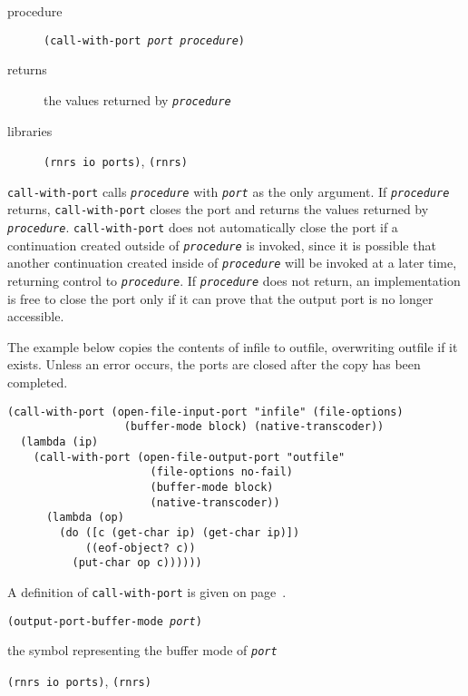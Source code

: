 \begin{description}

\label{io_s51}\label{io_desc_call_with_port}
\item[procedure] \texttt{(call-with-port \textit{port} \textit{procedure})}



\item[returns] the values returned by \texttt{\textit{procedure}}


\item[libraries] \texttt{(rnrs io ports)}, \texttt{(rnrs)}
\end{description}

\texttt{call-with-port} calls \texttt{\textit{procedure}} with \texttt{\textit{port}} as the only
argument.
If \texttt{\textit{procedure}} returns, \texttt{call-with-port} closes the port and
returns the values returned by \texttt{\textit{procedure}}.
\texttt{call-with-port} does not automatically close the
port if a continuation created outside of \texttt{\textit{procedure}} is invoked, since it
is possible that another continuation created inside of \texttt{\textit{procedure}} will be
invoked at a later time, returning control to \texttt{\textit{procedure}}.
If \texttt{\textit{procedure}} does not return, an implementation is free to close the
port only if it can prove that the output port is no longer accessible.

The example below copies the contents of infile to outfile, overwriting
outfile if it exists.
Unless an error occurs, the ports are closed after the copy has been
completed.


\begin{alltt}
(call-with-port (open-file-input-port "infile" (file-options)
                  (buffer-mode block) (native-transcoder))
  (lambda (ip)
    (call-with-port (open-file-output-port "outfile"
                      (file-options no-fail)
                      (buffer-mode block)
                      (native-transcoder)) 
      (lambda (op)
        (do ([c (get-char ip) (get-char ip)])
            ((eof-object? c))
          (put-char op c))))))
\end{alltt}


A definition of \texttt{call-with-port} is given on page \pageref{control_defn_call_with_port}.

\begin{description}

\label{io_s52}\item[procedure] \texttt{(output-port-buffer-mode \textit{port})}



\item[returns] the symbol representing the buffer mode of \texttt{\textit{port}}


\item[libraries] \texttt{(rnrs io ports)}, \texttt{(rnrs)}
\end{description}

